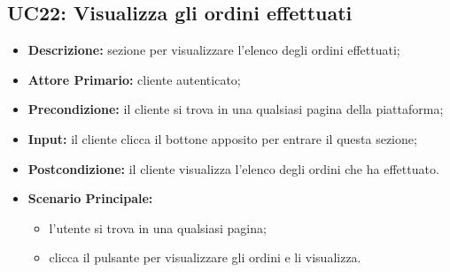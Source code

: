 \subsection{UC22: Visualizza gli ordini effettuati}
\label{sec:UC22}
\begin{itemize}
    \item \textbf{Descrizione:} sezione per visualizzare l'elenco degli ordini effettuati;
    \item \textbf{Attore Primario:} cliente autenticato;
    \item \textbf{Precondizione:} il cliente si trova in una qualsiasi pagina della piattaforma;
    \item \textbf{Input:} il cliente clicca il bottone apposito per entrare il questa sezione;
    \item \textbf{Postcondizione:} il cliente visualizza l'elenco degli ordini che ha effettuato.
    \item \textbf{Scenario Principale:}
          \begin{itemize}
              \item l'utente si trova in una qualsiasi pagina;
              \item clicca il pulsante per visualizzare gli ordini e li visualizza.
          \end{itemize}
\end{itemize}